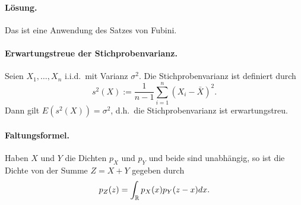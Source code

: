 \paragraph*{Lösung.} Das ist eine Anwendung des Satzes von Fubini.

\paragraph{Erwartungstreue der Stichprobenvarianz. } 
Seien $X_1,\ldots,X_n$ i.i.d.\ mit Varianz $\sigma^2$. Die Stichprobenvarianz
ist definiert durch
\begin{equation*}
    s^2(X) := \frac{1}{n-1} \sum_{i=1}^{n} (X_i - \bar X)^2.
\end{equation*}
Dann gilt $E(s^2(X)) = \sigma^2$, d.h.~die Stichprobenvarianz ist erwartungstreu.


\paragraph{Faltungsformel. } Haben $X$ und $Y$ die Dichten $p_X$ und $p_Y$ und beide
sind unabhängig, so ist die Dichte von der Summe $Z=X+Y$ gegeben durch
\begin{equation*}
    p_Z(z) = \int_{\mathbb R}^{} p_X(x)p_Y(z-x) dx.
\end{equation*}%


